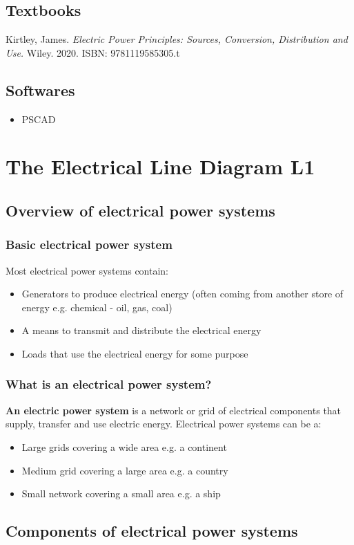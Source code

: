 \documentclass[class=report, crop=false, 12pt,a4paper]{standalone}
\begin{document}
\subsection{Textbooks}
Kirtley, James. \textit{Electric Power Principles: Sources, Conversion, Distribution and Use.} Wiley. 2020. ISBN: 9781119585305.t
\subsection{Softwares}
\begin{itemize}
	\item PSCAD
\end{itemize}
\section{The Electrical Line Diagram L1}
\subsection{Overview of electrical power systems}
\subsubsection{Basic electrical power system}
Most electrical power systems contain:
\begin{itemize}
	\item Generators to produce electrical energy (often coming from another store of energy e.g. chemical - oil, gas, coal)
	\item A means to transmit and distribute the electrical energy
	\item Loads that use the electrical energy for some purpose
\end{itemize}
\subsubsection{What is an electrical power system?}
\textbf{An electric power system} is a network or grid of electrical components that supply, transfer and use electric energy. Electrical power systems can be a:
\begin{itemize}
	\item Large grids covering a wide area e.g. a continent
	\item Medium grid covering a large area e.g. a country
	\item Small network covering a small area e.g. a ship
\end{itemize}
\subsection{Components of electrical power systems}
\end{document}
